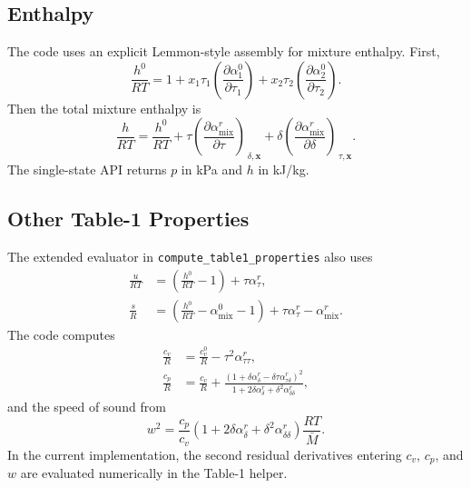 \documentclass[11pt]{article}
\begin{document}
\subsection{Enthalpy}
The code uses an explicit Lemmon-style assembly for mixture enthalpy. First,
\begin{equation}
\frac{h^0}{RT}
= 1 + x_1 \tau_1 \left(\frac{\partial \alpha_1^0}{\partial \tau_1}\right)
+ x_2 \tau_2 \left(\frac{\partial \alpha_2^0}{\partial \tau_2}\right).
\end{equation}
Then the total mixture enthalpy is
\begin{equation}
\frac{h}{RT}
=
\frac{h^0}{RT}
+ \tau \left(\frac{\partial \alpha_{\mathrm{mix}}^r}{\partial \tau}\right)_{\,\delta,\bm{x}}
+ \delta \left(\frac{\partial \alpha_{\mathrm{mix}}^r}{\partial \delta}\right)_{\,\tau,\bm{x}}.
\end{equation}
The single-state API returns $p$ in kPa and $h$ in kJ/kg.

\subsection{Other Table-1 Properties}
The extended evaluator in \texttt{compute\_table1\_properties} also uses
\begin{align}
\frac{u}{RT} &= \left(\frac{h^0}{RT}-1\right) + \tau \alpha_{\tau}^r, \\
\frac{s}{R} &= \left(\frac{h^0}{RT} - \alpha^0_{\mathrm{mix}} -1\right)
+ \tau \alpha_{\tau}^r - \alpha^r_{\mathrm{mix}}.
\end{align}
The code computes
\begin{align}
\frac{c_v}{R} &= \frac{c_v^0}{R} - \tau^2 \alpha_{\tau\tau}^r, \\
\frac{c_p}{R} &=
\frac{c_v}{R}
+ \frac{\left(1+\delta \alpha_{\delta}^r - \delta \tau \alpha_{\tau\delta}^r\right)^2}
{1 + 2\delta \alpha_{\delta}^r + \delta^2 \alpha_{\delta\delta}^r},
\end{align}
and the speed of sound from
\begin{equation}
w^2 =
\frac{c_p}{c_v}
\left(1 + 2\delta \alpha_{\delta}^r + \delta^2 \alpha_{\delta\delta}^r\right)
\frac{RT}{\bar{M}}.
\end{equation}
In the current implementation, the second residual derivatives entering $c_v$, $c_p$, and $w$ are evaluated numerically in the Table-1 helper.
\end{document}
